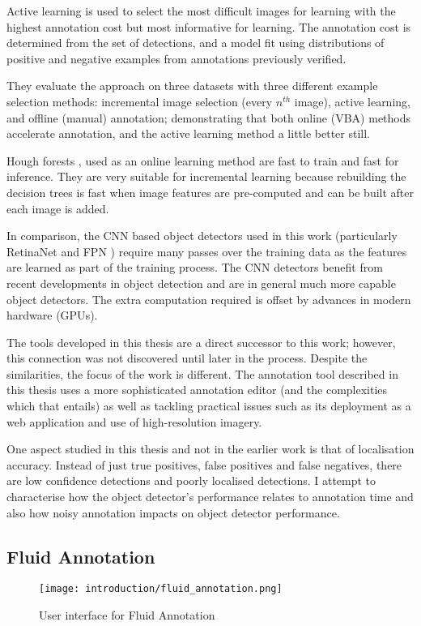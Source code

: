 Active learning is used to select the most difficult images for learning with the highest annotation cost but most informative for learning. The annotation cost is determined from the set of detections, and a model fit using distributions of positive and negative examples from annotations previously verified. 

They evaluate the approach on three datasets with three different example selection methods: incremental image selection (every $n^{th}$ image), active learning, and offline (manual) annotation; demonstrating that both online (\gls{VBA}) methods accelerate annotation, and the active learning method a little better still.

Hough forests \cite{Gall2011}, used as an online learning method are fast to train and fast for inference. They are very suitable for incremental learning because rebuilding the decision trees is fast when image features are pre-computed and can be built after each image is added. 

In comparison, the \gls{CNN} based object detectors used in this work (particularly RetinaNet \cite{Lin2017} and \gls{FPN} \cite{Lin2017a}) require many passes over the training data as the features are learned as part of the training process. The \gls{CNN} detectors benefit from recent developments in object detection and are in general much more capable object detectors. The extra computation required is offset by advances in modern hardware (\gls{GPU}s).

The tools developed in this thesis are a direct successor to this work; however, this connection was not discovered until later in the process. 
Despite the similarities, the focus of the work is different. The annotation tool described in this thesis uses a more sophisticated annotation editor (and the complexities which that entails) as well as tackling practical issues such as its deployment as a web application and use of high-resolution imagery.

One aspect studied in this thesis and not in the earlier work is that of localisation accuracy. Instead of just true positives, false positives and false negatives, there are low confidence detections and poorly localised detections. I attempt to characterise how the object detector's performance relates to annotation time and also how noisy annotation impacts on object detector performance.


\subsection{Fluid Annotation \cite{Andriluka2018}}
\begin{figure}[h]
  \centering
  \texttt{[image: introduction/fluid\_annotation.png]}
  \caption{User interface for Fluid Annotation \cite{Andriluka2018}}  
  \label{fig:fluid_annotation}
\end{figure}

